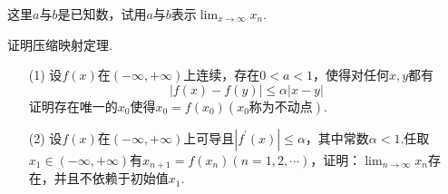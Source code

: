 \begin{xiti}
\noindent 这里$a$与$b$是已知数，试用$a$与$b$表示$\lim_{ x \rightarrow \infty }x_{n}$.
%	
%	
%	
%	
%	
%	
\item 证明压缩映射定理.
\begin{enumerate}
	\item[(1)] 设$f(x)$在$(-\infty,+\infty)$上连续，存在$0<a<1$，使得对任何$x,y$都有
	\[| f ( x ) - f ( y ) | \leqslant \alpha | x - y |\]
	证明存在唯一的$x_{0}$使得$x_{0}=f(x_{0})(x_{0}\text{称为不动点})$.
	\item[(2)] 设$f(x)$在$(-\infty,+\infty)$上可导且$\left| f ^ { \prime } ( x ) \right| \leqslant \alpha$，其中常数$\alpha<1$.任取$x _ { 1 } \in ( - \infty , + \infty )$有$x _ { n + 1 } = f \left( x _ { n } \right) ( n = 1,2 , \cdots )$，证明：$\lim_{ n \rightarrow \infty }x_{n}$存在，并且不依赖于初始值$x_{1}$.
\end{enumerate}
%		
%		
%		
%		
%		

\end{xiti}
